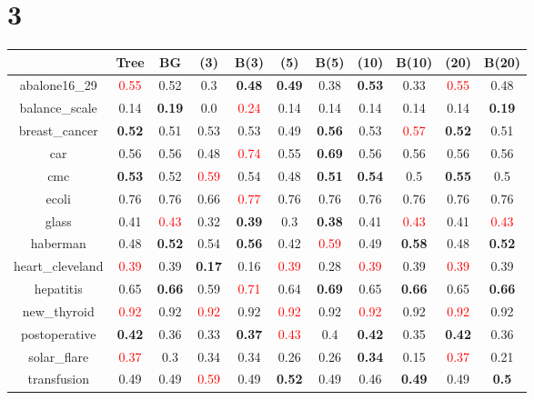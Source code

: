 \documentclass{article}%
\begin{document}
\section*{3}%
\begin{tabular}{c|cccccccccc}%
\hline%
&Tree&BG&(3)&B(3)&(5)&B(5)&(10)&B(10)&(20)&B(20)\\%
\hline%
abalone16\_29&\textcolor{red}{ 
0.55
}&0.52&0.3&\textbf{0.48}&\textbf{0.49}&0.38&\textbf{0.53}&0.33&\textcolor{red}{ 
0.55
}&0.48\\%
\hline%
balance\_scale&0.14&\textbf{0.19}&0.0&\textcolor{red}{ 
0.24
}&0.14&0.14&0.14&0.14&0.14&\textbf{0.19}\\%
\hline%
breast\_cancer&\textbf{0.52}&0.51&0.53&0.53&0.49&\textbf{0.56}&0.53&\textcolor{red}{ 
0.57
}&\textbf{0.52}&0.51\\%
\hline%
car&0.56&0.56&0.48&\textcolor{red}{ 
0.74
}&0.55&\textbf{0.69}&0.56&0.56&0.56&0.56\\%
\hline%
cmc&\textbf{0.53}&0.52&\textcolor{red}{ 
0.59
}&0.54&0.48&\textbf{0.51}&\textbf{0.54}&0.5&\textbf{0.55}&0.5\\%
\hline%
ecoli&0.76&0.76&0.66&\textcolor{red}{ 
0.77
}&0.76&0.76&0.76&0.76&0.76&0.76\\%
\hline%
glass&0.41&\textcolor{red}{ 
0.43
}&0.32&\textbf{0.39}&0.3&\textbf{0.38}&0.41&\textcolor{red}{ 
0.43
}&0.41&\textcolor{red}{ 
0.43
}\\%
\hline%
haberman&0.48&\textbf{0.52}&0.54&\textbf{0.56}&0.42&\textcolor{red}{ 
0.59
}&0.49&\textbf{0.58}&0.48&\textbf{0.52}\\%
\hline%
heart\_cleveland&\textcolor{red}{ 
0.39
}&0.39&\textbf{0.17}&0.16&\textcolor{red}{ 
0.39
}&0.28&\textcolor{red}{ 
0.39
}&0.39&\textcolor{red}{ 
0.39
}&0.39\\%
\hline%
hepatitis&0.65&\textbf{0.66}&0.59&\textcolor{red}{ 
0.71
}&0.64&\textbf{0.69}&0.65&\textbf{0.66}&0.65&\textbf{0.66}\\%
\hline%
new\_thyroid&\textcolor{red}{ 
0.92
}&0.92&\textcolor{red}{ 
0.92
}&0.92&\textcolor{red}{ 
0.92
}&0.92&\textcolor{red}{ 
0.92
}&0.92&\textcolor{red}{ 
0.92
}&0.92\\%
\hline%
postoperative&\textbf{0.42}&0.36&0.33&\textbf{0.37}&\textcolor{red}{ 
0.43
}&0.4&\textbf{0.42}&0.35&\textbf{0.42}&0.36\\%
\hline%
solar\_flare&\textcolor{red}{ 
0.37
}&0.3&0.34&0.34&0.26&0.26&\textbf{0.34}&0.15&\textcolor{red}{ 
0.37
}&0.21\\%
\hline%
transfusion&0.49&0.49&\textcolor{red}{ 
0.59
}&0.49&\textbf{0.52}&0.49&0.46&\textbf{0.49}&0.49&\textbf{0.5}\\%

\end{tabular}
\end{document}
